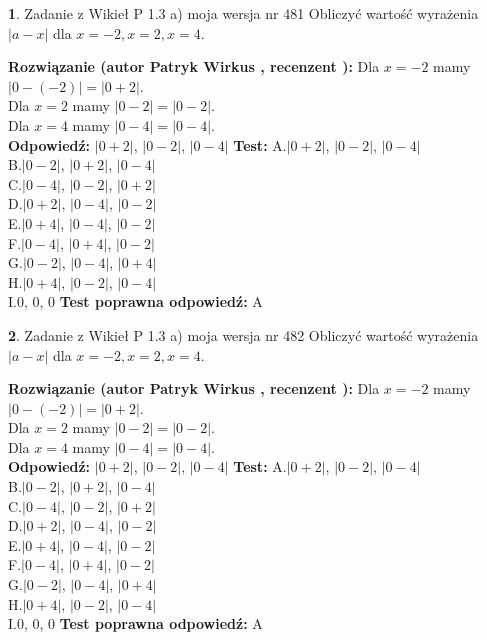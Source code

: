 \documentclass[12pt, a4paper]{article}
\theoremstyle{definition} %
\newtheorem{zad}{}
\newcommand{\zadStart}[1]{\begin{zad}#1\newline}
\newcommand{\zadStop}{\end{zad}}
\newcommand{\rozwStart}[2]{\noindent \textbf{Rozwiązanie (autor #1 , recenzent #2): }\newline}
\newcommand{\rozwStop}{\newline}
\newcommand{\odpStart}{\noindent \textbf{Odpowiedź:}\newline}
\newcommand{\odpStop}{\newline}
\newcommand{\testStart}{\noindent \textbf{Test:}\newline}
\newcommand{\testStop}{\newline}
\newcommand{\kluczStart}{\noindent \textbf{Test poprawna odpowiedź:}\newline}
\newcommand{\kluczStop}{\newline}
\begin{document}
\zadStart{Zadanie z Wikieł P 1.3 a) moja wersja nr 481}
Obliczyć wartość wyrażenia $|a - x|$ dla $x=-2,x=2,x=4$.
\zadStop
\rozwStart{Patryk Wirkus}{}
Dla $x = -2$ mamy $|0 - (-2)| = |0 + 2|$.\\
Dla $x = 2$ mamy $|0 - 2| = |0 - 2|$.\\
Dla $x = 4$ mamy $|0 - 4| = |0 - 4|$.\\
\rozwStop
\odpStart
$|0 + 2|$, $|0 - 2|$, $|0 - 4|$
\odpStop
\testStart
A.$|0 + 2|$, $|0 - 2|$, $|0 - 4|$\\
B.$|0 - 2|$, $|0 + 2|$, $|0 - 4|$\\
C.$|0 - 4|$, $|0 - 2|$, $|0 + 2|$\\
D.$|0 + 2|$, $|0 - 4|$, $|0 - 2|$\\
E.$|0 + 4|$, $|0 - 4|$, $|0 - 2|$\\
F.$|0 - 4|$, $|0 + 4|$, $|0 - 2|$\\
G.$|0 - 2|$, $|0 - 4|$, $|0 + 4|$\\
H.$|0 + 4|$, $|0 - 2|$, $|0 - 4|$\\
I.$0$, $0$, $0$
\testStop
\kluczStart
A
\kluczStop



\zadStart{Zadanie z Wikieł P 1.3 a) moja wersja nr 482}
Obliczyć wartość wyrażenia $|a - x|$ dla $x=-2,x=2,x=4$.
\zadStop
\rozwStart{Patryk Wirkus}{}
Dla $x = -2$ mamy $|0 - (-2)| = |0 + 2|$.\\
Dla $x = 2$ mamy $|0 - 2| = |0 - 2|$.\\
Dla $x = 4$ mamy $|0 - 4| = |0 - 4|$.\\
\rozwStop
\odpStart
$|0 + 2|$, $|0 - 2|$, $|0 - 4|$
\odpStop
\testStart
A.$|0 + 2|$, $|0 - 2|$, $|0 - 4|$\\
B.$|0 - 2|$, $|0 + 2|$, $|0 - 4|$\\
C.$|0 - 4|$, $|0 - 2|$, $|0 + 2|$\\
D.$|0 + 2|$, $|0 - 4|$, $|0 - 2|$\\
E.$|0 + 4|$, $|0 - 4|$, $|0 - 2|$\\
F.$|0 - 4|$, $|0 + 4|$, $|0 - 2|$\\
G.$|0 - 2|$, $|0 - 4|$, $|0 + 4|$\\
H.$|0 + 4|$, $|0 - 2|$, $|0 - 4|$\\
I.$0$, $0$, $0$
\testStop
\kluczStart
A
\kluczStop
\end{document}
